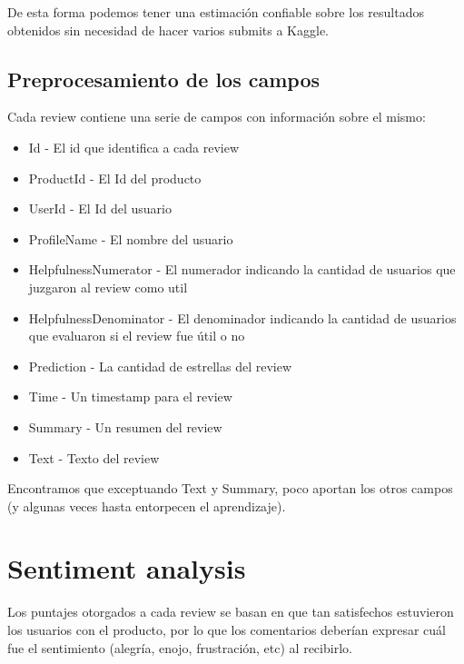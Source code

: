 De esta forma podemos tener una estimaci\'on confiable sobre los resultados obtenidos sin necesidad
de hacer varios submits a Kaggle.


\subsection{Preprocesamiento de los campos}

Cada review contiene una serie de campos con informaci\'on sobre el mismo:\\

\begin{itemize}
\setlength\itemsep{0em}
  \item Id - El id que identifica a cada review
  \item ProductId - El Id del producto
  \item UserId - El Id del usuario
  \item ProfileName - El nombre del usuario
  \item HelpfulnessNumerator - El numerador indicando la cantidad de usuarios que juzgaron al review como util
  \item HelpfulnessDenominator - El denominador indicando la cantidad de usuarios que evaluaron si el review fue útil o no
  \item Prediction - La cantidad de estrellas del review
  \item Time - Un timestamp para el review
  \item Summary - Un resumen del review
  \item Text - Texto del review
\end{itemize}

Encontramos que exceptuando Text y Summary, poco aportan los otros campos (y algunas veces hasta
entorpecen el aprendizaje).


\section{Sentiment analysis}

Los puntajes otorgados a cada review se basan en que tan satisfechos estuvieron los usuarios con
el producto, por lo que los comentarios deber\'ian expresar cu\'al fue el sentimiento (alegr\'ia,
enojo, frustraci\'on, etc) al recibirlo.

